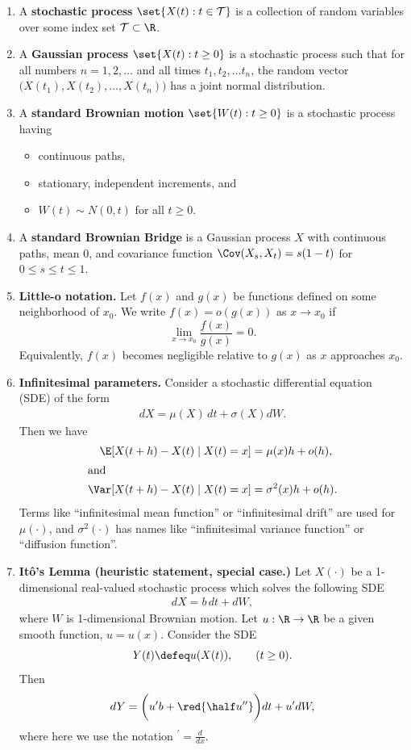 \documentclass{article} %
\begin{document}
\begin{enumerate}
\item A \textbf{stochastic process} $\set{X(t): t \in \mathcal{T}}$ is a collection of random variables over some index set $\mathcal{T} \subset \R$.
\item A \textbf{Gaussian process} $\set{X(t): t \geq 0}$ is a stochastic process such that for all numbers $n=1,2,\hdots$ and all times $t_1, t_2, \hdots t_n$, the random vector $\big( X(t_1), X(t_2), \hdots, X(t_n) \big)$ has a joint normal distribution.
\item A \textbf{standard Brownian motion} $\set{W(t): t \geq 0}$ is a stochastic process having
\begin{itemize}
\item[(i)] continuous paths,
\item[(ii)] stationary, independent increments, and
\item[(iii)] $W(t) \sim N(0,t)$ for all $t \geq 0$.
\end{itemize} 
\item A \textbf{standard Brownian Bridge} is a Gaussian process $X$ with continuous paths, mean 0, and covariance function $\Cov(X_s, X_t)=s(1-t)$ for $0 \leq s \leq t \leq 1$.

\item \textbf{Little-o notation.} Let $f(x)$ and $g(x)$ be functions defined on some neighborhood of $x_0$. We write
	$f(x) = o(g(x))$ as $x \to x_0$ if 
	\[
	\lim_{x \to x_0} \frac{f(x)}{g(x)} = 0.
	\]
Equivalently, $f(x)$ becomes negligible relative to $g(x)$ as $x$ approaches $x_0$.
\item \textbf{Infinitesimal parameters.} Consider a stochastic differential equation (SDE) of the form  
%
\begin{align*}
dX = \mu(X) \, dt + \sigma(X) dW.
\end{align*}
Then we have
%
\begin{align*}
\E[X(t+h)-X(t) \mid X(t)=x] &= \mu(x)h + o(h), \\
\intertext{and}
\Var[X(t+h)-X(t) \mid X(t)=x] &= \sigma^2(x)h + o(h). \\	
\end{align*}
%
Terms like \enquote{infinitesimal mean function} or \enquote{infinitesimal drift}  are used for $\mu(\cdot)$, and  $\sigma^2(\cdot)$ has names like \enquote{infinitesimal variance function} or \enquote{diffusion function}.
\item \textbf{It\^{o}'s Lemma (heuristic statement, special case.)} 
Let  $X(\cdot)$ be a 1-dimensional real-valued stochastic process which solves the following SDE  
%
\begin{align*}
dX = b \, dt + dW,
\end{align*}
where $W$ is 1-dimensional Brownian motion. Let $u: \R \to \R$ be a given smooth function, $u=u(x)$.  Consider the SDE 
\[ Y(t) \defeq u(X(t)), \qquad (t \geq 0). \]
Then 
\[ dY = \bigg(u'b + \red{\half u''} \bigg) dt + u' dW,  \]
where here we use the notation ${}^\prime = \frac{d}{dx}$.
\end{enumerate}
\end{document}
